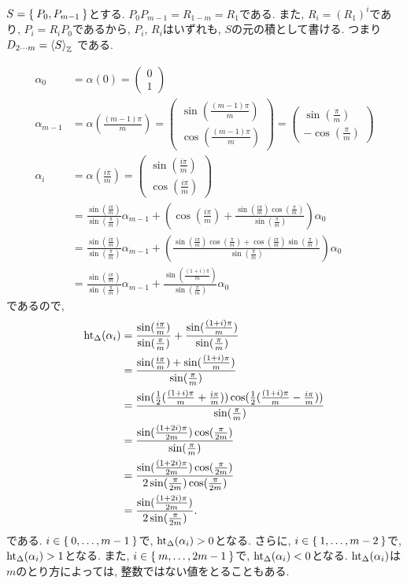 $S=\Set{P_0,P_{m-1}}$とする.
$P_0P_{m-1}=R_{1-m}=R_1$である.
また, $R_i=(R_1)^i$であり, $P_i=R_iP_0$であるから,
$P_i$, $R_i$はいずれも, $S$の元の積として書ける.
つまり
$D_{2\cdots m}=\Braket{S}_{\mathbb{Z}}$
である.

\begin{align*}
  \alpha_0&=\alpha(0)=\begin{pmatrix}0\\1\end{pmatrix}\\
  \alpha_{m-1}&=\alpha(\frac{(m-1)\pi}{m})=
  \begin{pmatrix}\sin(\frac{(m-1)\pi}{m})\\\cos(\frac{(m-1)\pi}{m})\end{pmatrix}=
\begin{pmatrix}\sin(\frac{\pi}{m})\\-\cos(\frac{\pi}{m})\end{pmatrix}
  \\
  \alpha_{i}&=\alpha(\frac{i\pi}{m})=
  \begin{pmatrix}\sin(\frac{i\pi}{m})\\\cos(\frac{i\pi}{m})\end{pmatrix}\\
  &=
  \frac{\sin(\frac{i\pi}{m})}{\sin(\frac{\pi}{m})}\alpha_{m-1}
  +
  (\cos(\frac{i\pi}{m})+\frac{\sin(\frac{i\pi}{m})\cos(\frac{\pi}{m})}{\sin(\frac{\pi}{m})})\alpha_{0}\\
  &=
  \frac{\sin(\frac{i\pi}{m})}{\sin(\frac{\pi}{m})}\alpha_{m-1}
  +
  (\frac{\sin(\frac{i\pi}{m})\cos(\frac{\pi}{m})+\cos(\frac{i\pi}{m})\sin(\frac{\pi}{m})}{\sin(\frac{\pi}{m})})\alpha_{0}\\
  &=
  \frac{\sin(\frac{i\pi}{m})}{\sin(\frac{\pi}{m})}\alpha_{m-1}
  +
  \frac{\sin(\frac{(1+i)\pi}{m})}{\sin(\frac{\pi}{m})}\alpha_{0}
\end{align*}
であるので,
\begin{align*}
  \operatorname{ht}_{\Delta}(\alpha_i)
  &=
  \frac{\sin(\frac{i\pi}{m})}{\sin(\frac{\pi}{m})}
  +
  \frac{\sin(\frac{(1+i)\pi}{m})}{\sin(\frac{\pi}{m})}\\
  &=
  \frac{\sin(\frac{i\pi}{m})+\sin(\frac{(1+i)\pi}{m})}{\sin(\frac{\pi}{m})}\\
  &=
  \frac{\sin(\frac{1}{2}(\frac{(1+i)\pi}{m}+\frac{i\pi}{m}))\cos(\frac{1}{2}(\frac{(1+i)\pi}{m}-\frac{i\pi}{m}))}{\sin(\frac{\pi}{m})}\\
  &=
  \frac{\sin(\frac{(1+2i)\pi}{2m})\cos(\frac{\pi}{2m})}{\sin(\frac{\pi}{m})}\\
  &=
  \frac{\sin(\frac{(1+2i)\pi}{2m})\cos(\frac{\pi}{2m})}{2\sin(\frac{\pi}{2m})\cos(\frac{\pi}{2m})}\\
  &=
  \frac{\sin(\frac{(1+2i)\pi}{2m})}{2\sin(\frac{\pi}{2m})}.
\end{align*}
である.
$i\in \Set{0,\ldots,m-1}$で, $\operatorname{ht}_\Delta(\alpha_i)>0$となる.
さらに,
$i\in \Set{1,\ldots,m-2}$で, $\operatorname{ht}_\Delta(\alpha_i)>1$となる.
また,
$i\in \Set{m,\ldots,2m-1}$で, $\operatorname{ht}_\Delta(\alpha_i)<0$となる.
$\operatorname{ht}_\Delta(\alpha_i)$は$m$のとり方によっては, 整数ではない値をとることもある.

